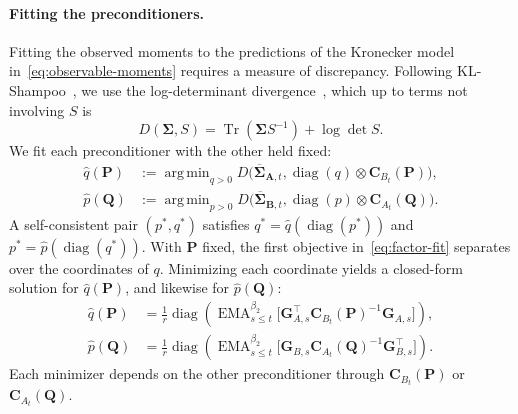 \documentclass{article}
\newcommand{\mat}[1]{\bm{#1}}
\DeclareMathOperator{\diag}{diag}
\DeclareMathOperator{\Tr}{Tr}
\DeclareMathOperator{\EMA}{EMA}
\DeclareMathOperator*{\argmin}{arg\,min}
\begin{document}
\paragraph{Fitting the preconditioners.} Fitting the observed moments
to the predictions of the Kronecker model
in~\eqref{eq:observable-moments} requires a measure of discrepancy. Following
KL-Shampoo~\cite{klshampoo}, we use the log-determinant
divergence~\cite{logdetdiv}, which up to terms not involving $S$ is
\[
  D(\mat{\Sigma},S)=\Tr(\mat{\Sigma} S^{-1})+\log\det S.
\]
We fit each preconditioner with the other held fixed:
\begin{equation}\label{eq:factor-fit}
\begin{aligned}
  \hat q(\mat{P})&:=\argmin_{q>0}
    D\bigl(\overline{\mat{\Sigma}}_{\mat{A},t},\diag(q)\otimes \mat{C}_{B_t}(\mat{P})\bigr),\\
  \hat p(\mat{Q})&:=\argmin_{p>0}
    D\bigl(\overline{\mat{\Sigma}}_{\mat{B},t},\diag(p)\otimes \mat{C}_{A_t}(\mat{Q})\bigr).
\end{aligned}
\end{equation}
A self-consistent pair $(p^*,q^*)$ satisfies $q^*=\hat q(\diag(p^*))$ and $p^*=\hat p(\diag(q^*))$. With $\mat{P}$ fixed, the first objective in~\eqref{eq:factor-fit} separates over the coordinates of $q$. Minimizing each coordinate yields a closed-form solution for $\hat q(\mat{P})$, and likewise for $\hat p(\mat{Q})$:
\begin{equation}\label{eq:conditional-minimizers}
\begin{aligned}
  \hat q(\mat{P})&=\frac1r\diag\left(\EMA^{\beta_2}_{s\le t}\bigl[\mat{G}_{A,s}^\top \mat{C}_{B_t}(\mat{P})^{-1}\mat{G}_{A,s}\bigr]\right),\\
  \hat p(\mat{Q})&=\frac1r\diag\left(\EMA^{\beta_2}_{s\le t}\bigl[\mat{G}_{B,s} \mat{C}_{A_t}(\mat{Q})^{-1}\mat{G}_{B,s}^\top\bigr]\right).
\end{aligned}
\end{equation}
Each minimizer depends on the other preconditioner through
$\mat{C}_{B_t}(\mat{P})$ or $\mat{C}_{A_t}(\mat{Q})$.
\end{document}
